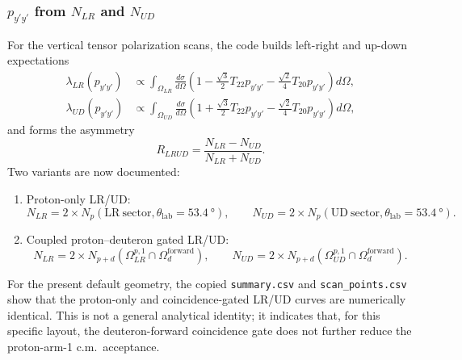 \documentclass[11pt,a4paper]{article}
\begin{document}
\subsubsection{\texorpdfstring{$p_{y'y'}$ from $N_{LR}$ and $N_{UD}$}{pyy from NLR and NUD}}

For the vertical tensor polarization scans, the code builds left-right and up-down expectations
\begin{equation}
\label{eq:pyy_lrud_counts}
\begin{aligned}
    \lambda_{LR}(p_{y'y'}) &\propto \int_{\Omega_{LR}}
    \frac{d\sigma}{d\Omega}\left(
        1 - \frac{\sqrt{3}}{2}T_{22}p_{y'y'} - \frac{\sqrt{2}}{4}T_{20}p_{y'y'}
    \right)d\Omega, \\
    \lambda_{UD}(p_{y'y'}) &\propto \int_{\Omega_{UD}}
    \frac{d\sigma}{d\Omega}\left(
        1 + \frac{\sqrt{3}}{2}T_{22}p_{y'y'} - \frac{\sqrt{2}}{4}T_{20}p_{y'y'}
    \right)d\Omega,
\end{aligned}
\end{equation}
and forms the asymmetry
\begin{equation}
\label{eq:pyy_lrud_ratio_impl}
    R_{LRUD} = \frac{N_{LR} - N_{UD}}{N_{LR} + N_{UD}}.
\end{equation}
Two variants are now documented:
\begin{enumerate}
    \item Proton-only LR/UD:
    \begin{equation}
        N_{LR} = 2\times N_p(\mathrm{LR\ sector}, \theta_{\mathrm{lab}}=\SI{53.4}{\degree}),
        \qquad
        N_{UD} = 2\times N_p(\mathrm{UD\ sector}, \theta_{\mathrm{lab}}=\SI{53.4}{\degree}).
    \end{equation}
    \item Coupled proton--deuteron gated LR/UD:
    \begin{equation}
        N_{LR} = 2\times N_{p+d}(\Omega_{LR}^{p,1}\cap \Omega_d^{\mathrm{forward}}),
        \qquad
        N_{UD} = 2\times N_{p+d}(\Omega_{UD}^{p,1}\cap \Omega_d^{\mathrm{forward}}).
    \end{equation}
\end{enumerate}
For the present default geometry, the copied \texttt{summary.csv} and \texttt{scan\_points.csv} show that the proton-only and coincidence-gated LR/UD curves are numerically identical. This is not a general analytical identity; it indicates that, for this specific layout, the deuteron-forward coincidence gate does not further reduce the proton-arm-1 c.m.\ acceptance.
\end{document}
